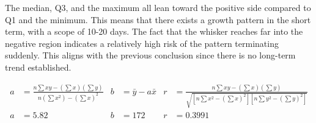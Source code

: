 \documentclass{article}
\begin{document}
\begin{figure}[h]
    \centering
\end{figure}
The median, Q3, and the maximum all lean toward the positive side compared to Q1 and the minimum. This means that there exists a growth pattern in the short term, with a scope of 10-20 days. The fact that the whisker reaches far into the negative region indicates a relatively high risk of the pattern terminating suddenly. This aligns with the previous conclusion since there is no long-term trend established.



\begin{align*}
    a&=\frac{n \sum x y-\left(\sum x\right)\left(\sum y\right)}{n\left(\sum x^2\right)-\left(\sum x\right)^2} & b&=\bar{y}-a \bar{x} & r&=\frac{n \sum x y-\left(\sum x\right)\left(\sum y\right)}{\sqrt{\left[n \sum x^2-\left(\sum x\right)^2\right]\left[n \sum y^2-\left(\sum y\right)^2\right]}}\\
    a&=5.82     & b&=172         & r&=0.3991
\end{align*}
\end{document}

